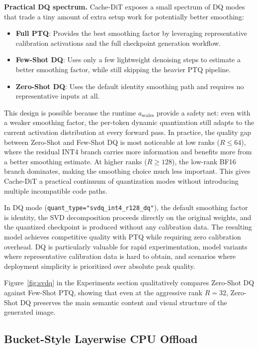 \documentclass[10pt]{article}
\begin{document}
\textbf{Practical DQ spectrum.} Cache-DiT exposes a small spectrum of DQ modes that trade a tiny amount of extra setup work for potentially better smoothing:

\begin{itemize}
    \item \textbf{Full PTQ}: Provides the best smoothing factor by leveraging representative calibration activations and the full checkpoint generation workflow.
    \item \textbf{Few-Shot DQ}: Uses only a few lightweight denoising steps to estimate a better smoothing factor, while still skipping the heavier PTQ pipeline.
    \item \textbf{Zero-Shot DQ}: Uses the default identity smoothing path and requires no representative inputs at all.
\end{itemize}

This design is possible because the runtime $a_{\text{scales}}$ provide a safety net: even with a weaker smoothing factor, the per-token dynamic quantization still adapts to the current activation distribution at every forward pass. In practice, the quality gap between Zero-Shot and Few-Shot DQ is most noticeable at low ranks ($R \leq 64$), where the residual INT4 branch carries more information and benefits more from a better smoothing estimate. At higher ranks ($R \geq 128$), the low-rank BF16 branch dominates, making the smoothing choice much less important. This gives Cache-DiT a practical continuum of quantization modes without introducing multiple incompatible code paths.

In DQ mode (\texttt{quant\_type="svdq\_int4\_r128\_dq"}), the default smoothing factor is identity, the SVD decomposition proceeds directly on the original weights, and the quantized checkpoint is produced without any calibration data. The resulting model achieves competitive quality with PTQ while requiring zero calibration overhead. DQ is particularly valuable for rapid experimentation, model variants where representative calibration data is hard to obtain, and scenarios where deployment simplicity is prioritized over absolute peak quality.

Figure~\ref{fig:svdq} in the Experiments section qualitatively compares Zero-Shot DQ against Few-Shot PTQ, showing that even at the aggressive rank $R=32$, Zero-Shot DQ preserves the main semantic content and visual structure of the generated image.

\subsection{Bucket-Style Layerwise CPU Offload}
\label{sec:offload}
\end{document}
